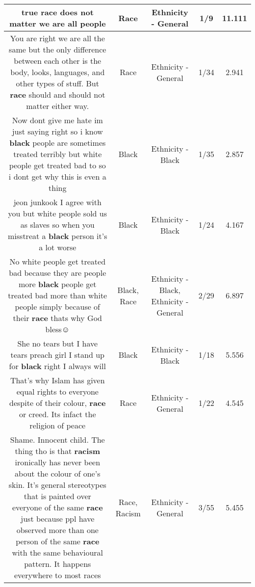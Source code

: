\documentclass[11pt]{article}
\newlength\mylength
\begin{document}
\begin{center}
\begin{longtable}{|C{.65\mylength}|C{.30\mylength}|C{.12\mylength}|C{.12\mylength}|C{.12\mylength}|}
  \small true \textbf{race} does not matter we are all people\normalsize   & Race & Ethnicity - General & 1/9 & 11.111 \\  \hline
  \small You are right we are all the same but the only difference between each other is the body, looks, languages, and other types of stuff. But \textbf{race} should and should not matter either way.\normalsize   & Race & Ethnicity - General & 1/34 & 2.941 \\  \hline
  \small Now dont give me hate im just saying right so i know \textbf{black} people are sometimes treated terribly but white people get treated bad to so i dont get why this is even a thing\normalsize   & Black & Ethnicity - Black & 1/35 & 2.857 \\  \hline
  \small jeon junkook I agree with you but white people sold us as slaves so when you misstreat a \textbf{black} person  it's a lot worse\normalsize   & Black & Ethnicity - Black & 1/24 & 4.167 \\  \hline
  \small No white people get treated bad because they are people more \textbf{black} people get treated bad more than white people simply because of their \textbf{race} thats why God bless☺\normalsize   & Black, Race & Ethnicity - Black, Ethnicity - General & 2/29 & 6.897 \\  \hline
  \small She no tears but I have tears preach girl I stand up for \textbf{black} right I always will\normalsize   & Black & Ethnicity - Black & 1/18 & 5.556 \\  \hline
  \small That's why Islam has given equal rights to everyone despite of their colour, \textbf{race} or creed. Its infact the religion of peace\normalsize   & Race & Ethnicity - General & 1/22 & 4.545 \\  \hline
  \small Shame. Innocent child. The thing tho is that \textbf{racism} ironically has never been about the colour of one's skin. It's general stereotypes that is painted over everyone of the same \textbf{race} just because ppl have observed more than one person of the same \textbf{race} with the same behavioural pattern. It happens everywhere to most races\normalsize   & Race, Racism & Ethnicity - General & 3/55 & 5.455 \\  \hline

\end{longtable}
\end{center}
\end{document}
